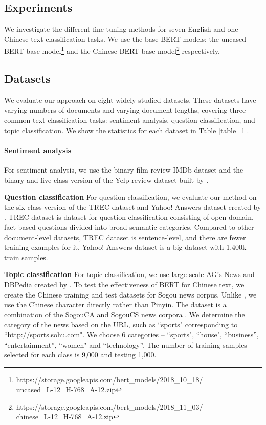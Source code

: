 \documentclass[11pt,a4paper]{article}
\theoremstyle{definition}
\begin{document}
\begin{CJK*}{UTF8}{gbsn}
	\section{Experiments}
    We investigate the different fine-tuning methods for seven English and one Chinese text classification tasks. We use the base BERT models: the uncased BERT-base model\footnote{https://storage.googleapis.com/bert\_models/2018\_10\_18/\\uncased\_L-12\_H-768\_A-12.zip} and the Chinese BERT-base model\footnote{https://storage.googleapis.com/bert\_models/2018\_11\_03/\\chinese\_L-12\_H-768\_A-12.zip} respectively.

	\subsection{Datasets} \label{s_1}
	We evaluate our approach on eight widely-studied datasets. These datasets have varying numbers of documents and varying document lengths, covering three common text classification tasks: sentiment analysis, question classification, and topic classification. We show the statistics for each dataset in Table \ref{table_1}.
	
	\paragraph{Sentiment analysis}
	\quad For sentiment analysis, we use the binary film review IMDb dataset \cite{maas2011learning} and the binary and five-class version of the Yelp review dataset built by \citet{zhang2015character}.
	
	{\noindent \textbf{Question classification}}
	\quad For question classification, we evaluate our method on the six-class version of the TREC dataset \cite{voorhees1999trec} and Yahoo! Answers dataset created by \citet{zhang2015character}. TREC dataset is dataset for question classification consisting of open-domain, fact-based questions divided into broad semantic categories. Compared to other document-level datasets, TREC dataset is sentence-level, and there are fewer training examples for it. Yahoo! Answers dataset is a big dataset with 1,400k train samples.
	
    {\noindent \textbf{Topic classification}}
	\quad For topic classification, we use large-scale AG's News and DBPedia created by \citet{zhang2015character}. To test the effectiveness of BERT for Chinese text, we create the Chinese training and test datasets for Sogou news corpus. Unlike \citet{zhang2015character}, we use the Chinese character directly rather than Pinyin. The dataset is a combination of the SogouCA and SogouCS news corpora \cite{wang2008automatic}. We determine the category of the news based on the URL, such as ``sports" corresponding to ``http://sports.sohu.com". We choose 6 categories – ``sports", ``house", ``business”, ``entertainment”, ``women" and ``technology”. The number of training samples selected for each class is 9,000 and testing 1,000.
	

\end{CJK*}
\end{document}
